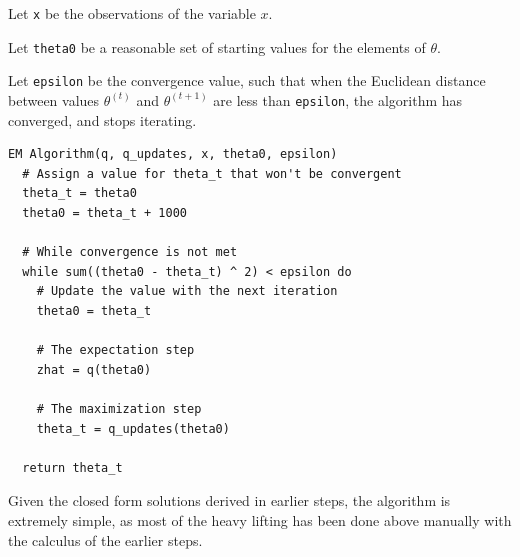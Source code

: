 \documentclass[]{article}
\begin{document}
Let \texttt{x} be the observations of the variable \(x\).

Let \texttt{theta0} be a reasonable set of starting values for the
elements of \(\theta\).

Let \texttt{epsilon} be the convergence value, such that when the
Euclidean distance between values \(\theta^{(t)}\) and
\(\theta^{(t + 1)}\) are less than \texttt{epsilon}, the algorithm has
converged, and stops iterating.

\begin{verbatim}
EM Algorithm(q, q_updates, x, theta0, epsilon)
  # Assign a value for theta_t that won't be convergent
  theta_t = theta0
  theta0 = theta_t + 1000
  
  # While convergence is not met
  while sum((theta0 - theta_t) ^ 2) < epsilon do 
    # Update the value with the next iteration
    theta0 = theta_t
    
    # The expectation step
    zhat = q(theta0)
    
    # The maximization step
    theta_t = q_updates(theta0)

  return theta_t
\end{verbatim}

Given the closed form solutions derived in earlier steps, the algorithm
is extremely simple, as most of the heavy lifting has been done above
manually with the calculus of the earlier steps.
\end{document}
